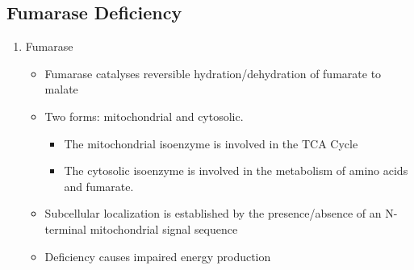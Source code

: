 \documentclass{scrartcl}
\begin{document}
\subsection{Fumarase Deficiency}
\label{sec:org5e6f227}
\begin{enumerate}
\item Fumarase
\label{sec:orgf7371d7}
\begin{itemize}
\item Fumarase catalyses reversible hydration/dehydration of fumarate to malate
\item Two forms: mitochondrial and cytosolic.
\begin{itemize}
\item The mitochondrial isoenzyme is involved in the TCA Cycle
\item The cytosolic isoenzyme is involved in the metabolism of amino acids and fumarate.
\end{itemize}
\item Subcellular localization is established by the presence/absence of an N-terminal mitochondrial signal
sequence
\item Deficiency causes impaired energy production
\end{itemize}


\end{enumerate}
\end{document}
